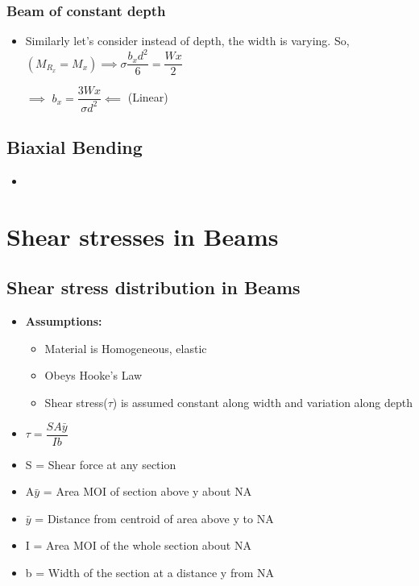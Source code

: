 \documentclass[8pt]{report}
\begin{document}
	\subsection{Beam of constant depth}
		\begin{itemize}
			\item Similarly let's consider instead of depth, the width is varying. So, $(M_{R_x} = M_x) \implies \sigma\dfrac{b_xd^2}{6} = \dfrac{Wx}{2}$
			\item[$\implies$] $\boxed{b_x = \dfrac{3Wx}{\sigma d^2}}\impliedby$ (Linear)
		\end{itemize}\hrulefill
	\section{Biaxial Bending}
		\begin{itemize}
			\item 
		\end{itemize}\hrulefill
\chapter{Shear stresses in Beams}
	\section{Shear stress distribution in Beams}
		\begin{itemize}
			\item \textbf{Assumptions:}
				\begin{itemize}
					\item Material is Homogeneous, elastic
					\item Obeys Hooke's Law
					\item Shear stress($\tau$) is assumed constant along width and variation along depth
				\end{itemize}
			\item $\boxed{\tau = \dfrac{SA\bar{y}}{Ib}}$
			\item S = Shear force at any section
			\item A$\bar{y}$ = Area MOI of section above y about NA
			\item $\bar{y}$ = Distance from centroid of area above y to NA
			\item I = Area MOI of the whole section about NA
			\item b = Width of the section at a distance y from NA
		\end{itemize}\hrulefill
\end{document}
